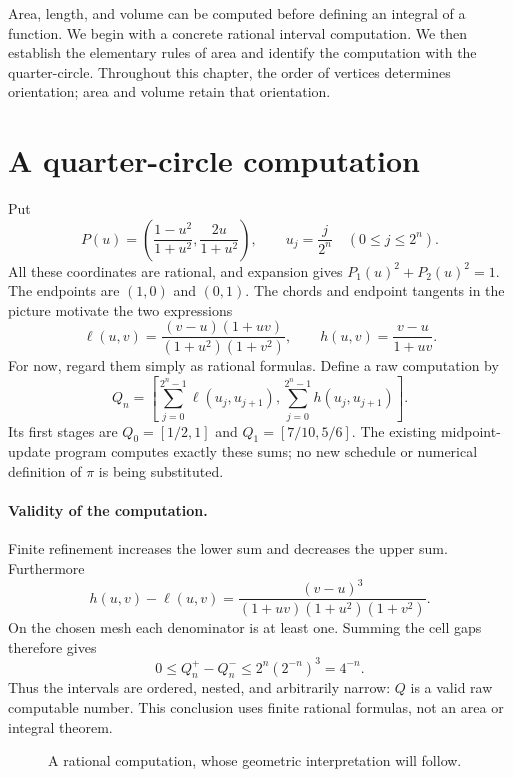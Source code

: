 Area, length, and volume can be computed before defining an integral of a
function. We begin with a concrete rational interval computation. We then
establish the elementary rules of area and identify the computation with the
quarter-circle. Throughout this chapter, the order of vertices determines
orientation; area and volume retain that orientation.

\section{A quarter-circle computation}
\label{thm:rational-circle-pythagorean}
Put
\[
 P(u)=\left(\frac{1-u^2}{1+u^2},\frac{2u}{1+u^2}\right),
 \qquad u_j=\frac{j}{2^n}\quad(0\le j\le2^n).
\]
All these coordinates are rational, and expansion gives
$P_1(u)^2+P_2(u)^2=1$. The endpoints are $(1,0)$ and $(0,1)$.
The chords and endpoint tangents in the picture motivate the two expressions
\[
 \ell(u,v)=\frac{(v-u)(1+uv)}{(1+u^2)(1+v^2)},
 \qquad h(u,v)=\frac{v-u}{1+uv}.
\]
For now, regard them simply as rational formulas. Define a raw computation by
\[
 Q_n=\left[
   \sum_{j=0}^{2^n-1}\ell(u_j,u_{j+1}),
   \sum_{j=0}^{2^n-1}h(u_j,u_{j+1})
 \right].
\]
Its first stages are $Q_0=[1/2,1]$ and $Q_1=[7/10,5/6]$.
The existing midpoint-update program computes exactly these sums; no new
schedule or numerical definition of $\pi$ is being substituted.

\paragraph{Validity of the computation.}\label{thm:quarter-circle-raw}
Finite refinement increases the lower sum and decreases the upper sum.
Furthermore
\[
 h(u,v)-\ell(u,v)=
 \frac{(v-u)^3}{(1+uv)(1+u^2)(1+v^2)}.
\]
On the chosen mesh each denominator is at least one. Summing the cell gaps
therefore gives
\[
 0\le Q_n^+-Q_n^-\le2^n(2^{-n})^3=4^{-n}.
\]
Thus the intervals are ordered, nested, and arbitrarily narrow: $Q$ is a
valid raw computable number. This conclusion uses finite rational formulas,
not an area or integral theorem.

\begin{figure}[htbp]\centering
\rationalCircleSubdivisionAnimation
\caption{A rational computation, whose geometric interpretation will follow.}
\label{fig:rational-parameter-line}
\end{figure}

